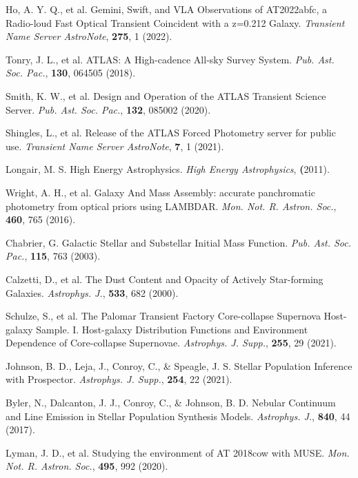 \documentclass{nature_plusfigure}
\newcommand{\mn}{{Mon. Not. R. Astron. Soc.}}
\newcommand{\mnras}{\mn}
\newcommand{\apj}{{Astrophys. J.}}
\newcommand{\apjs}{{Astrophys. J. Supp.}}
\newcommand{\pasp}{{Pub. Ast. Soc. Pac.}}
\begin{document}
\begin{methods}
\begin{thebibliography}{10}

 Ho, A. Y. Q., et al. Gemini, Swift, and VLA Observations of AT2022abfc, a Radio-loud Fast Optical Transient Coincident with a z=0.212 Galaxy. \emph{Transient Name Server AstroNote}, \textbf{275}, 1 (2022). 

  Tonry, J. L., et al. ATLAS: A High-cadence All-sky Survey System. \emph{\pasp}, \textbf{130}, 064505 (2018). 

 Smith, K. W., et al. Design and Operation of the ATLAS Transient Science Server. \emph{\pasp}, \textbf{132}, 085002 (2020). 

 Shingles, L., et al. Release of the ATLAS Forced Photometry server for public use. \emph{Transient Name Server AstroNote}, \textbf{7}, 1 (2021). 

  Longair, M. S. High Energy Astrophysics. \emph{High Energy Astrophysics}, \textbf (2011). 
 
 
  Wright, A. H., et al. Galaxy And Mass Assembly: accurate panchromatic photometry from optical priors using LAMBDAR. \emph{\mnras}, \textbf{460}, 765 (2016). 
 
   Chabrier, G. Galactic Stellar and Substellar Initial Mass Function. \emph{\pasp}, \textbf{115}, 763 (2003). 

 Calzetti, D., et al. The Dust Content and Opacity of Actively Star-forming Galaxies. \emph{\apj}, \textbf{533}, 682 (2000). 

 Schulze, S., et al. The Palomar Transient Factory Core-collapse Supernova Host-galaxy Sample. I. Host-galaxy Distribution Functions and Environment Dependence of Core-collapse Supernovae. \emph{\apjs}, \textbf{255}, 29 (2021). 

  Johnson, B. D., Leja, J., Conroy, C., \& Speagle, J. S. Stellar Population Inference with Prospector. \emph{\apjs}, \textbf{254}, 22 (2021). 
 
  Byler, N., Dalcanton, J. J., Conroy, C., \& Johnson, B. D. Nebular Continuum and Line Emission in Stellar Population Synthesis Models. \emph{\apj}, \textbf{840}, 44 (2017). 
 
 
  Lyman, J. D., et al. Studying the environment of AT 2018cow with MUSE. \emph{\mnras}, \textbf{495}, 992 (2020). 


\end{thebibliography}
\end{methods}
\end{document}
